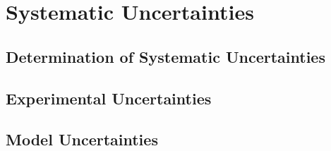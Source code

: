 \chapter{Systematic Uncertainties}

\section{Determination of Systematic Uncertainties}

\section{Experimental Uncertainties}

\section{Model Uncertainties}